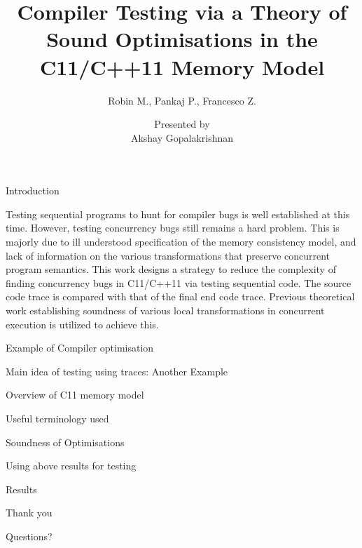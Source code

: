 \documentclass[notes, xcolor=dvipsnames]{beamer}
\title{Compiler Testing via a Theory of Sound Optimisations in the C11/C++11 Memory Model}
\subtitle{Robin M., Pankaj P., Francesco Z.}
\author{Presented by \\ Akshay Gopalakrishnan}
\begin{document}
    
    \begin{frame}
        
        \maketitle

    \end{frame}

    \begin{frame}{Introduction}

        Testing sequential programs to hunt for compiler bugs is well established at this time. 
        However, testing concurrency bugs still remains a hard problem. 
        This is majorly due to ill understood specification of the memory consistency model, and lack of information on the various transformations that preserve concurrent program semantics.
        This work designs a strategy to reduce the complexity of finding concurrency bugs in C11/C++11 via testing sequential code.
        The source code trace is compared with that of the final end code trace.
        Previous theoretical work establishing soundness of various local transformations in concurrent execution is utilized to achieve this. 
        
    \end{frame}

    \begin{frame}{Example of Compiler optimisation}
        
    \end{frame}

    \begin{frame}{Main idea of testing using traces: Another Example}
        
    \end{frame}

    \begin{frame}{Overview of C11 memory model}
        
    \end{frame}

    \begin{frame}{Useful terminology used}
        
    \end{frame}

    \begin{frame}{Soundness of Optimisations}
        
    \end{frame}

    \begin{frame}{Using above results for testing}
        
    \end{frame}

    \begin{frame}{Results}
        

    \end{frame}

    \begin{frame}{Thank you}

        Questions?

    \end{frame}
\end{document}
